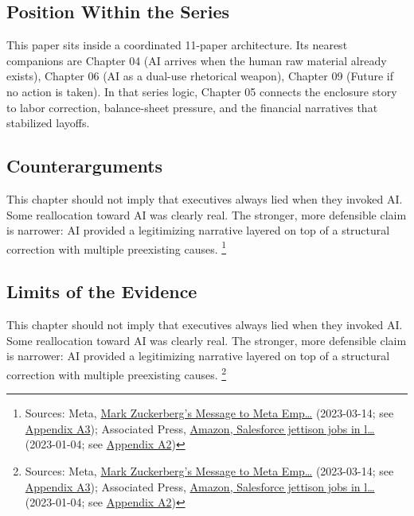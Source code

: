 \documentclass[
  american,
  11pt,
  letterpaper,
]{article}
\begin{document}
\subsection{Position Within the
Series}\label{position-within-the-series}

This paper sits inside a coordinated 11-paper architecture. Its nearest
companions are Chapter 04 (AI arrives when the human raw material
already exists), Chapter 06 (AI as a dual-use rhetorical weapon),
Chapter 09 (Future if no action is taken). In that series logic, Chapter
05 connects the enclosure story to labor correction, balance-sheet
pressure, and the financial narratives that stabilized layoffs.

\subsection{Counterarguments}\label{counterarguments}

This chapter should not imply that executives always lied when they
invoked AI. Some reallocation toward AI was clearly real. The stronger,
more defensible claim is narrower: AI provided a legitimizing narrative
layered on top of a structural correction with multiple preexisting
causes. \footnote{Sources: Meta,
  \href{https://about.fb.com/news/2023/03/mark-zuckerberg-meta-year-of-efficiency/}{Mark
  Zuckerberg's Message to Meta Emp\ldots{}} (2023-03-14; see
  \hyperref[appendix-a3-mark-zuckerberg-s-message-to-meta-employees]{Appendix
  A3}); Associated Press,
  \href{https://apnews.com/article/bbb2f3a09eafdfc7cda54a3b87e538ad}{Amazon,
  Salesforce jettison jobs in l\ldots{}} (2023-01-04; see
  \hyperref[appendix-a2-amazon-salesforce-jettison-jobs-in-latest-tech-worker-purge]{Appendix
  A2})}

\subsection{Limits of the Evidence}\label{limits-of-the-evidence}

This chapter should not imply that executives always lied when they
invoked AI. Some reallocation toward AI was clearly real. The stronger,
more defensible claim is narrower: AI provided a legitimizing narrative
layered on top of a structural correction with multiple preexisting
causes. \footnote{Sources: Meta,
  \href{https://about.fb.com/news/2023/03/mark-zuckerberg-meta-year-of-efficiency/}{Mark
  Zuckerberg's Message to Meta Emp\ldots{}} (2023-03-14; see
  \hyperref[appendix-a3-mark-zuckerberg-s-message-to-meta-employees]{Appendix
  A3}); Associated Press,
  \href{https://apnews.com/article/bbb2f3a09eafdfc7cda54a3b87e538ad}{Amazon,
  Salesforce jettison jobs in l\ldots{}} (2023-01-04; see
  \hyperref[appendix-a2-amazon-salesforce-jettison-jobs-in-latest-tech-worker-purge]{Appendix
  A2})}
\end{document}
